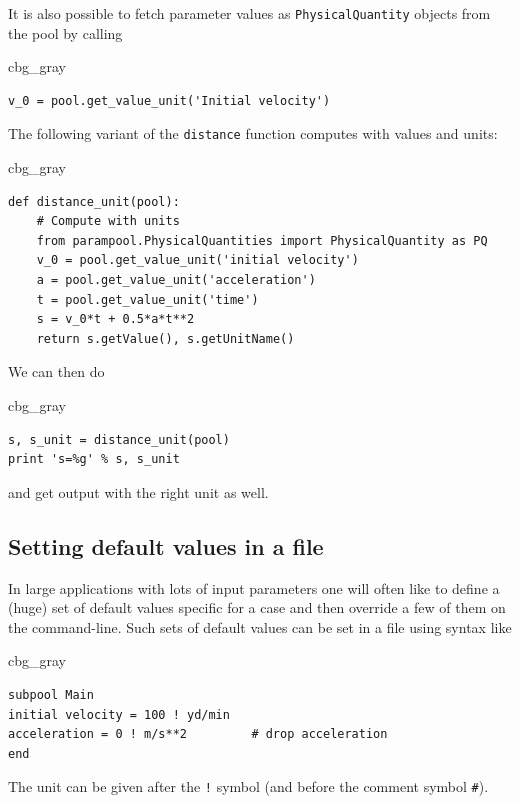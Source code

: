 \documentclass[graybox,envcountchap,sectrefs,final]{svmonodo}
\newenvironment{_cod_tight}[1]{
   \def\FrameCommand{\colorbox{#1}}
   \FrameRule0.6pt\MakeFramed {\FrameRestore}\vskip3mm}
   {\vskip0mm\endMakeFramed}
\newenvironment{cod}[1]{
\bgroup\rmfamily
\fboxsep=0mm\relax
\begin{_cod_tight}{#1}
\list{}{\parsep=-2mm\parskip=0mm\topsep=0pt\leftmargin=2mm
\rightmargin=2\leftmargin\leftmargin=4pt\relax}
\item\relax}
{\endlist\end{_cod_tight}\egroup}
\begin{document}
It is also possible to fetch parameter values as \texttt{PhysicalQuantity}
objects from the pool by calling

\begin{cod}{cbg_gray}\begin{Verbatim}[numbers=none,fontsize=\fontsize{9pt}{9pt},baselinestretch=0.95,xleftmargin=2mm]
v_0 = pool.get_value_unit('Initial velocity')
\end{Verbatim}
\end{cod}
\noindent
The following variant of the \texttt{distance} function computes with
values and units:

\begin{cod}{cbg_gray}\begin{Verbatim}[numbers=none,fontsize=\fontsize{9pt}{9pt},baselinestretch=0.95,xleftmargin=2mm]
def distance_unit(pool):
    # Compute with units
    from parampool.PhysicalQuantities import PhysicalQuantity as PQ
    v_0 = pool.get_value_unit('initial velocity')
    a = pool.get_value_unit('acceleration')
    t = pool.get_value_unit('time')
    s = v_0*t + 0.5*a*t**2
    return s.getValue(), s.getUnitName()
\end{Verbatim}
\end{cod}
\noindent
We can then do

\begin{cod}{cbg_gray}\begin{Verbatim}[numbers=none,fontsize=\fontsize{9pt}{9pt},baselinestretch=0.95,xleftmargin=2mm]
s, s_unit = distance_unit(pool)
print 's=%g' % s, s_unit
\end{Verbatim}
\end{cod}
\noindent
and get output with the right unit as well.

\subsection{Setting default values in a file}

In large applications with lots of input parameters one will often like
to define a (huge) set of default values specific for a case and then
override a few of them on the command-line. Such sets of default values
can be set in a file using syntax like

\begin{cod}{cbg_gray}\begin{Verbatim}[numbers=none,fontsize=\fontsize{9pt}{9pt},baselinestretch=0.95,xleftmargin=2mm]
subpool Main
initial velocity = 100 ! yd/min
acceleration = 0 ! m/s**2         # drop acceleration
end
\end{Verbatim}
\end{cod}
\noindent
The unit can be given after the \Verb?!? symbol (and before the comment symbol \Verb!#!).
\end{document}
